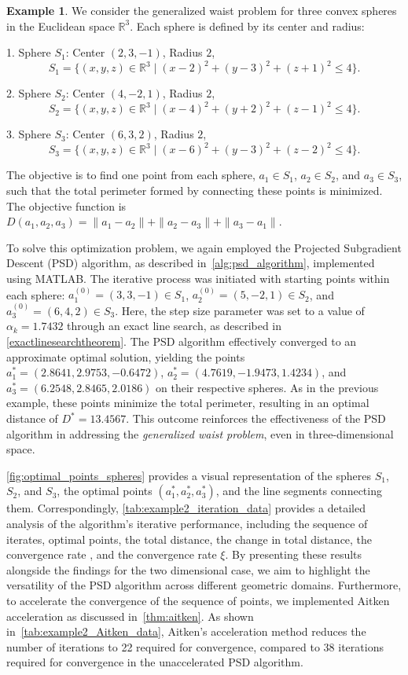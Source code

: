 \documentclass[12pt]{article}
\theoremstyle{plain}
\theoremstyle{definition}
\newtheorem{example}[theorem]{Example}
\begin{document}
\newpage

\begin{example}
	We consider the generalized waist problem for three convex spheres in the Euclidean space \(\mathbb{R}^3\). Each sphere is defined by its center and radius:
	
	1. Sphere \(S_1\): Center \((2, 3, -1)\), Radius \(2\),
	\[
	S_1 = \{(x, y, z) \in \mathbb{R}^3 \mid (x - 2)^2 + (y - 3)^2 + (z + 1)^2 \leq 4\}.
	\]
	
	2. Sphere \(S_2\): Center \((4, -2, 1)\), Radius \(2\),
	\[
	S_2 = \{(x, y, z) \in \mathbb{R}^3 \mid (x - 4)^2 + (y + 2)^2 + (z - 1)^2 \leq 4\}.
	\]
	
	3. Sphere \(S_3\): Center \((6, 3, 2)\), Radius \(2\),
	\[
	S_3 = \{(x, y, z) \in \mathbb{R}^3 \mid (x - 6)^2 + (y - 3)^2 + (z - 2)^2 \leq 4\}.
	\]
	
	The objective is to find one point from each sphere, \(a_1 \in S_1\), \(a_2 \in S_2\), and \(a_3 \in S_3\), such that the total perimeter formed by connecting these points is minimized. The objective function is $D(a_1, a_2, a_3) = \|a_1 - a_2\| + \|a_2 - a_3\| + \|a_3 - a_1\|.$
\end{example}

To solve this optimization problem, we again employed the Projected Subgradient Descent (PSD) algorithm, as described in~\ref{alg:psd_algorithm}, implemented using MATLAB. The iterative process was initiated with starting points within each sphere: \(a_1^{(0)} = (3, 3, -1) \in S_1\), \(a_2^{(0)} = (5, -2, 1) \in S_2\), and \(a_3^{(0)} = (6, 4, 2) \in S_3\). Here, the step size parameter was set to a value of \(\alpha_k = 1.7432\) through an exact line search, as described in \ref{exactlinesearchtheorem}. The PSD algorithm effectively converged to an approximate optimal solution, yielding the points \(a_1^* = (2.8641, 2.9753, -0.6472)\), \(a_2^* = (4.7619, -1.9473, 1.4234)\), and \(a_3^* = (6.2548, 2.8465, 2.0186)\) on their respective spheres. As in the previous example, these points minimize the total perimeter, resulting in an optimal distance of \(D^* = 13.4567\). This outcome reinforces the effectiveness of the PSD algorithm in addressing the \textit{generalized waist problem}, even in three-dimensional space.

\ref{fig:optimal_points_spheres} provides a visual representation of the spheres \(S_1\), \(S_2\), and \(S_3\), the optimal points \((a_1^*, a_2^*, a_3^*)\), and the line segments connecting them. Correspondingly, \ref{tab:example2_iteration_data} provides a detailed analysis of the algorithm’s iterative performance, including the sequence of iterates, optimal points, the total distance, the change in total distance, the convergence rate , and the convergence rate \(\xi\). By presenting these results alongside the findings for the two dimensional case, we aim to highlight the versatility of the PSD algorithm across different geometric domains. Furthermore, to accelerate the convergence of the sequence of points, we implemented Aitken acceleration as discussed in~\ref{thm:aitken}. As shown in~\ref{tab:example2_Aitken_data}, Aitken's acceleration method reduces the number of iterations to 22 required for convergence, compared to 38 iterations required for convergence in the unaccelerated PSD algorithm.
\end{document}
